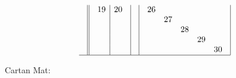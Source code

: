 \documentclass[12pt,a4paper]{amsart}
\begin{document}
\begin{align*}
\begin{array}{r||c|c|c|c}
&
    \begin{array}{c|c}
      19&20\\
      &\\
      &\\
      &\\
      &\\
    \end{array}
&
&
  \begin{array}{ccccc}
26&&&&\\
&27&&&\\
&&28&&\\
&&&29&\\
&&&&30\\
  \end{array}
\\\hline
  \end{array}
\end{align*}


\newpage
\normalsize {}
Cartan Mat:
\end{document}

